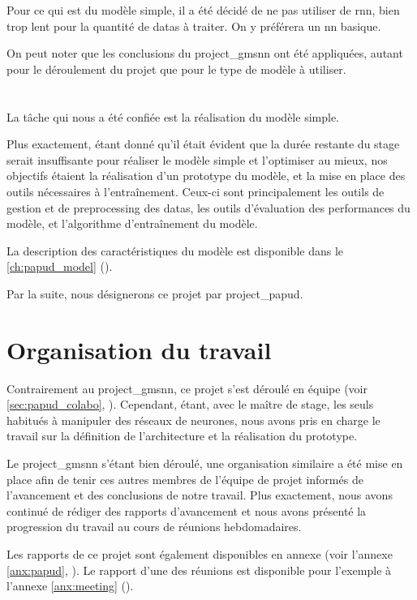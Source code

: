 Pour ce qui est du modèle simple, il a été décidé de ne pas utiliser de \gls{rnn}, bien trop lent pour la quantité de \glspl{data} à traiter. On y préférera un \gls{nn} basique.

On peut noter que les conclusions du \gls{project_gmsnn} ont été appliquées, autant pour le déroulement du projet que pour le type de modèle à utiliser.


\section{}
La tâche qui nous a été confiée est la réalisation du modèle simple.

Plus exactement, étant donné qu'il était évident que la durée restante du stage serait insuffisante pour réaliser le modèle simple et l'optimiser au mieux, nos objectifs étaient la réalisation d'un prototype du modèle, et la mise en place des outils nécessaires à l'entraînement.
Ceux-ci sont principalement les outils de gestion et de \gls{preprocessing} des \glspl{data}, les outils d'évaluation des performances du modèle, et l'algorithme d'entraînement du modèle.

La description des caractéristiques du modèle est disponible dans le \autoref{ch:papud_model} ().

Par la suite, nous désignerons ce projet par \og \gls{project_papud}\fg{}.

\section{Organisation du travail}
Contrairement au \gls{project_gmsnn}, ce projet s'est déroulé en équipe (voir \autoref{sec:papud_colabo}, ).
Cependant, étant, avec le maître de stage, les seuls habitués à manipuler des réseaux de neurones, nous avons pris en charge le travail sur la définition de l'architecture et la réalisation du prototype.

Le \gls{project_gmsnn} s'étant bien déroulé, une organisation similaire a été mise en place afin de tenir ces autres membres de l'équipe de projet informés de l'avancement et des conclusions de notre travail.
Plus exactement, nous avons continué de rédiger des rapports d'avancement et nous avons présenté la progression du travail au cours de réunions hebdomadaires.

Les rapports de ce projet sont également disponibles en annexe (voir l'annexe \ref{anx:papud}, ).
Le rapport d'une des réunions est disponible pour l'exemple à l'annexe \ref{anx:meeting} (). %

